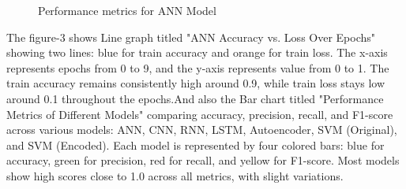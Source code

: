 \documentclass{llncs}
\begin{document}
\begin{figure}[H]
\hspace{-1.4cm}
    \caption{\small{Performance metrics for ANN Model}}
    \label{fig:abc}
\end{figure}
The figure-3 shows Line graph titled "ANN Accuracy vs. Loss Over Epochs" showing two lines: blue for train accuracy and orange for train loss. The x-axis represents epochs from 0 to 9, and the y-axis represents value from 0 to 1. The train accuracy remains consistently high around 0.9, while train loss stays low around 0.1 throughout the epochs.And also the Bar chart titled "Performance Metrics of Different Models" comparing accuracy, precision, recall, and F1-score across various models: ANN, CNN, RNN, LSTM, Autoencoder, SVM (Original), and SVM (Encoded). Each model is represented by four colored bars: blue for accuracy, green for precision, red for recall, and yellow for F1-score. Most models show high scores close to 1.0 across all metrics, with slight variations.
\end{document}
